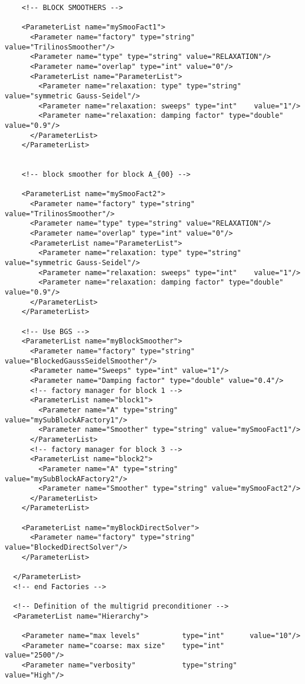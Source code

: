 \documentclass[10pt,fleqn]{book}
\begin{document}
\begin{lstlisting}
    <!-- BLOCK SMOOTHERS -->

    <ParameterList name="mySmooFact1">
      <Parameter name="factory" type="string" value="TrilinosSmoother"/>
      <Parameter name="type" type="string" value="RELAXATION"/>
      <Parameter name="overlap" type="int" value="0"/>
      <ParameterList name="ParameterList">
        <Parameter name="relaxation: type" type="string" value="symmetric Gauss-Seidel"/>
        <Parameter name="relaxation: sweeps" type="int"    value="1"/>
        <Parameter name="relaxation: damping factor" type="double" value="0.9"/>
      </ParameterList>
    </ParameterList>


    <!-- block smoother for block A_{00} -->

    <ParameterList name="mySmooFact2">
      <Parameter name="factory" type="string" value="TrilinosSmoother"/>
      <Parameter name="type" type="string" value="RELAXATION"/>
      <Parameter name="overlap" type="int" value="0"/>
      <ParameterList name="ParameterList">
        <Parameter name="relaxation: type" type="string" value="symmetric Gauss-Seidel"/>
        <Parameter name="relaxation: sweeps" type="int"    value="1"/>
        <Parameter name="relaxation: damping factor" type="double" value="0.9"/>
      </ParameterList>
    </ParameterList>

    <!-- Use BGS -->
    <ParameterList name="myBlockSmoother">
      <Parameter name="factory" type="string" value="BlockedGaussSeidelSmoother"/>
      <Parameter name="Sweeps" type="int" value="1"/>
      <Parameter name="Damping factor" type="double" value="0.4"/> 
      <!-- factory manager for block 1 -->
      <ParameterList name="block1">
        <Parameter name="A" type="string" value="mySubBlockAFactory1"/>
        <Parameter name="Smoother" type="string" value="mySmooFact1"/>
      </ParameterList>
      <!-- factory manager for block 3 -->
      <ParameterList name="block2">
        <Parameter name="A" type="string" value="mySubBlockAFactory2"/>
        <Parameter name="Smoother" type="string" value="mySmooFact2"/>
      </ParameterList>
    </ParameterList>

    <ParameterList name="myBlockDirectSolver">
      <Parameter name="factory" type="string" value="BlockedDirectSolver"/>
    </ParameterList>

  </ParameterList>
  <!-- end Factories -->

  <!-- Definition of the multigrid preconditioner -->
  <ParameterList name="Hierarchy">

    <Parameter name="max levels"          type="int"      value="10"/>
    <Parameter name="coarse: max size"    type="int"      value="2500"/>
    <Parameter name="verbosity"           type="string"   value="High"/>


\end{lstlisting}
\end{document}
